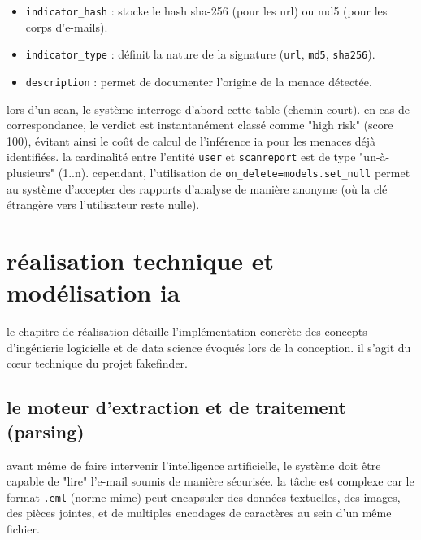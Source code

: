 \documentclass[12pt,a4paper]{report}
\begin{document}
\begin{itemize}
    \item \texttt{indicator\_hash} : stocke le hash sha-256 (pour les url) ou md5 (pour les corps d'e-mails).
    \item \texttt{indicator\_type} : définit la nature de la signature (\texttt{url}, \texttt{md5}, \texttt{sha256}).
    \item \texttt{description} : permet de documenter l'origine de la menace détectée.
\end{itemize}
lors d'un scan, le système interroge d'abord cette table (chemin court). en cas de correspondance, le verdict est instantanément classé comme "high risk" (score 100), évitant ainsi le coût de calcul de l'inférence ia pour les menaces déjà identifiées.
la cardinalité entre l'entité \texttt{user} et \texttt{scanreport} est de type "un-à-plusieurs" (1..n). cependant, l'utilisation de \texttt{on\_delete=models.set\_null} permet au système d'accepter des rapports d'analyse de manière anonyme (où la clé étrangère vers l'utilisateur reste nulle).


\chapter{réalisation technique et modélisation ia}

le chapitre de réalisation détaille l'implémentation concrète des concepts d'ingénierie logicielle et de data science évoqués lors de la conception. il s'agit du cœur technique du projet fakefinder.

\section{le moteur d'extraction et de traitement (parsing)}
avant même de faire intervenir l'intelligence artificielle, le système doit être capable de "lire" l'e-mail soumis de manière sécurisée. la tâche est complexe car le format \texttt{.eml} (norme mime) peut encapsuler des données textuelles, des images, des pièces jointes, et de multiples encodages de caractères au sein d'un même fichier.
\end{document}
